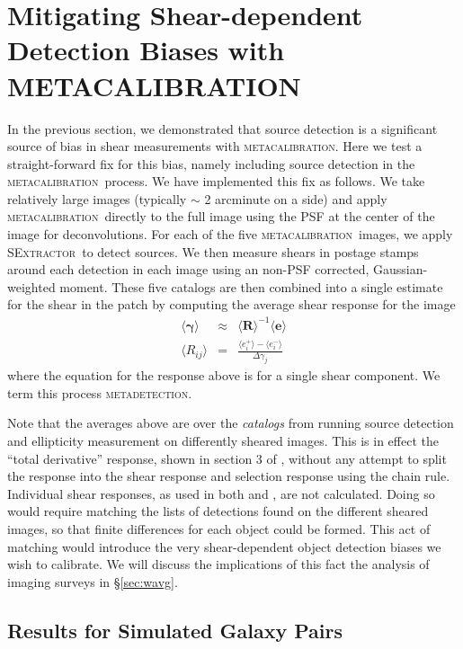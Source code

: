 \documentclass[fleqn,useAMS,usenatbib]{mnras}
\newcommand{\mcal}{\textsc{metacalibration}}
\newcommand{\mdet}{\textsc{metadetection}}
\newcommand{\sx}{\textsc{SExtractor}}
\begin{document}
\section{Mitigating Shear-dependent Detection Biases with \textsc{METACALIBRATION}}
\label{sec:mitigate}

In the previous section, we demonstrated that source detection is a significant
source of bias in shear measurements with \mcal. Here we test a
straight-forward fix for this bias, namely including source detection in the
\mcal\ process. We have implemented this fix as follows. We take relatively
large images (typically $\sim$ 2 arcminute on a side) and apply \mcal\ directly
to the full image using the PSF at the center of the image for deconvolutions.
For each of the five \mcal\ images, we apply \sx\ to detect sources. We then
measure shears in postage stamps around each detection in each image using an
non-PSF corrected, Gaussian-weighted moment.  These five catalogs are then
combined into a single estimate for the shear in the patch by computing the
average shear response for the image
\begin{eqnarray}
\langle \boldsymbol\gamma \rangle &\approx& \langle \boldsymbol{R}\rangle^{-1}\langle\boldsymbol{e}\rangle\\
\langle R_{ij}\rangle &=& \frac{\langle e_i^{+}\rangle - \langle e_i^{-}\rangle}{\Delta\gamma_j}
\end{eqnarray}
where the equation for the response above is for a single shear component. We term this
process \mdet.

Note that the averages above are over the {\it catalogs} from running source
detection and ellipticity measurement on differently sheared images. This is in
effect the ``total derivative'' response, shown in section 3 of
\cite{SheldonMcal2017}, without any attempt to split the response into the
shear response and selection response using the chain rule.  Individual shear
responses, as used in both \cite{SheldonMcal2017} and \cite{HuffMcal2017}, are
not calculated.  Doing so would require matching the lists of detections found
on the different sheared images, so that finite differences for each object
could be formed.  This act of matching would introduce the very shear-dependent
object detection biases we wish to calibrate.  We will discuss the implications
of this fact the analysis of imaging surveys in \S \ref{sec:wavg}.

\subsection{Results for Simulated Galaxy Pairs}
\label{sec:mdetpairs}
\end{document}
